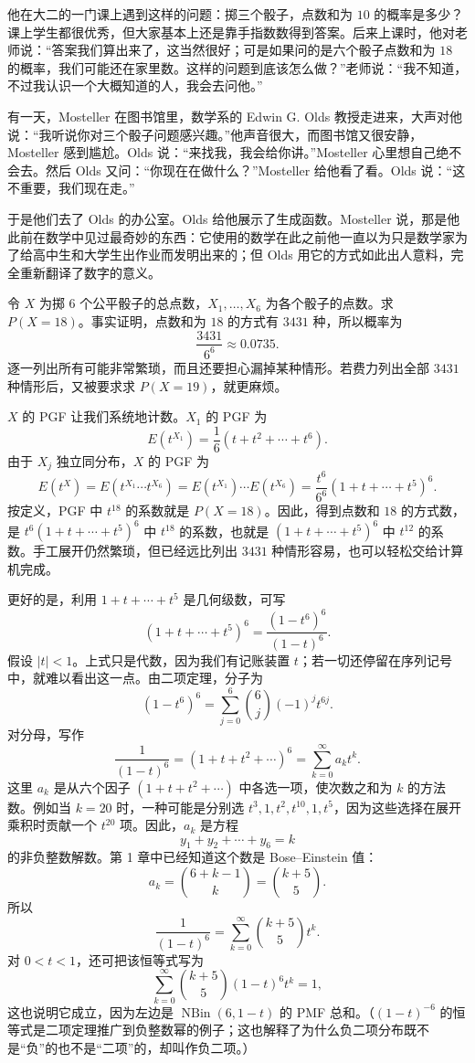 \documentclass[UTF8, 12pt, fontset=fandol, oneside]{ctexart}
\begin{document}
他在大二的一门课上遇到这样的问题：掷三个骰子，点数和为 $10$ 的概率是多少？课上学生都很优秀，但大家基本上还是靠手指数数得到答案。后来上课时，他对老师说：“答案我们算出来了，这当然很好；可是如果问的是六个骰子点数和为 $18$ 的概率，我们可能还在家里数。这样的问题到底该怎么做？”老师说：“我不知道，不过我认识一个大概知道的人，我会去问他。”

有一天，Mosteller 在图书馆里，数学系的 Edwin G. Olds 教授走进来，大声对他说：“我听说你对三个骰子问题感兴趣。”他声音很大，而图书馆又很安静，Mosteller 感到尴尬。Olds 说：“来找我，我会给你讲。”Mosteller 心里想自己绝不会去。然后 Olds 又问：“你现在在做什么？”Mosteller 给他看了看。Olds 说：“这不重要，我们现在走。”

于是他们去了 Olds 的办公室。Olds 给他展示了生成函数。Mosteller 说，那是他此前在数学中见过最奇妙的东西：它使用的数学在此之前他一直以为只是数学家为了给高中生和大学生出作业而发明出来的；但 Olds 用它的方式如此出人意料，完全重新翻译了数字的意义。

令 $X$ 为掷 $6$ 个公平骰子的总点数，$X_1,\ldots,X_6$ 为各个骰子的点数。求 $P(X=18)$。事实证明，点数和为 $18$ 的方式有 $3431$ 种，所以概率为
\[
  \frac{3431}{6^6}\approx0.0735.
\]
逐一列出所有可能非常繁琐，而且还要担心漏掉某种情形。若费力列出全部 $3431$ 种情形后，又被要求求 $P(X=19)$，就更麻烦。

$X$ 的 PGF 让我们系统地计数。$X_1$ 的 PGF 为
\[
  E(t^{X_1})=\frac16(t+t^2+\cdots+t^6).
\]
由于 $X_j$ 独立同分布，$X$ 的 PGF 为
\[
  E(t^X)=E(t^{X_1}\cdots t^{X_6})
  =
  E(t^{X_1})\cdots E(t^{X_6})
  =
  \frac{t^6}{6^6}(1+t+\cdots+t^5)^6.
\]
按定义，PGF 中 $t^{18}$ 的系数就是 $P(X=18)$。因此，得到点数和 $18$ 的方式数，是 $t^6(1+t+\cdots+t^5)^6$ 中 $t^{18}$ 的系数，也就是 $(1+t+\cdots+t^5)^6$ 中 $t^{12}$ 的系数。手工展开仍然繁琐，但已经远比列出 $3431$ 种情形容易，也可以轻松交给计算机完成。

更好的是，利用 $1+t+\cdots+t^5$ 是几何级数，可写
\[
  (1+t+\cdots+t^5)^6=\frac{(1-t^6)^6}{(1-t)^6}.
\]
假设 $|t|<1$。上式只是代数，因为我们有记账装置 $t$；若一切还停留在序列记号中，就难以看出这一点。由二项定理，分子为
\[
  (1-t^6)^6=\sum_{j=0}^6\binom{6}{j}(-1)^jt^{6j}.
\]
对分母，写作
\[
  \frac1{(1-t)^6}=(1+t+t^2+\cdots)^6=\sum_{k=0}^{\infty}a_kt^k.
\]
这里 $a_k$ 是从六个因子 $(1+t+t^2+\cdots)$ 中各选一项，使次数之和为 $k$ 的方法数。例如当 $k=20$ 时，一种可能是分别选 $t^3,1,t^2,t^{10},1,t^5$，因为这些选择在展开乘积时贡献一个 $t^{20}$ 项。因此，$a_k$ 是方程
\[
  y_1+y_2+\cdots+y_6=k
\]
的非负整数解数。第 1 章中已经知道这个数是 Bose--Einstein 值：
\[
  a_k=\binom{6+k-1}{k}=\binom{k+5}{5}.
\]
所以
\[
  \frac1{(1-t)^6}=\sum_{k=0}^{\infty}\binom{k+5}{5}t^k.
\]
对 $0<t<1$，还可把该恒等式写为
\[
  \sum_{k=0}^{\infty}\binom{k+5}{5}(1-t)^6t^k=1,
\]
这也说明它成立，因为左边是 $\operatorname{NBin}(6,1-t)$ 的 PMF 总和。（$(1-t)^{-6}$ 的恒等式是二项定理推广到负整数幂的例子；这也解释了为什么负二项分布既不是“负”的也不是“二项”的，却叫作负二项。）
\end{document}
